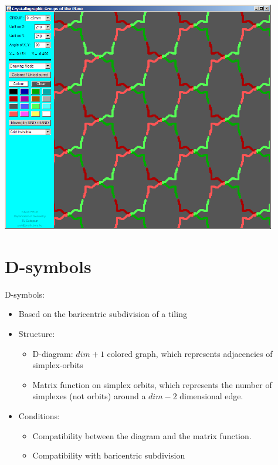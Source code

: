 \begin{frame}
  \includegraphics[width=0.9\textwidth]{illustration8.png}
\end{frame}

\section{D-symbols}
\begin{frame}
  D-symbols:
  \begin{itemize}
    \item Based on the baricentric subdivision of a tiling
    \item Structure:
      \begin{itemize}
	\item D-diagram: $dim+1$ colored graph, which represents adjacencies of
	  simplex-orbits
	\item Matrix function on simplex orbits, which represents the number of
	  simplexes (not orbits) around a $dim-2$ dimensional edge.
      \end{itemize}
    \item Conditions:
      \begin{itemize}
	\item Compatibility between the diagram and the matrix function.
	\item Compatibility with baricentric subdivision
      \end{itemize}
  \end{itemize}
\end{frame}

